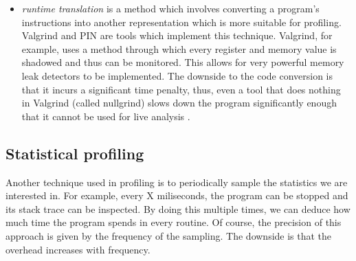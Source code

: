 \begin{itemize}
\begin{itemize}
\item \textit{runtime translation} is a method which involves converting a program's instructions into another representation which is more suitable for profiling. Valgrind\cite{Nethercote07} and PIN\cite{Luk05} are tools which implement this technique. Valgrind, for example, uses a method through which every register and memory value is shadowed and thus can be monitored. This allows for very powerful memory leak detectors to be implemented. The downside to the code conversion is that it incurs a significant time penalty, thus, even a tool that does nothing in Valgrind (called nullgrind) slows down the program significantly enough that it cannot be used for live analysis \cite{Newsome05}.
\end{itemize}
\end{itemize}




\subsection{Statistical profiling}
\label{subsection:statisticalprofiling}

Another technique used in profiling is to periodically sample the statistics we are interested in. For example, every X miliseconds, the program can be stopped and its stack trace can be inspected. By doing this  multiple times, we can deduce how much time the program spends in every routine. Of course, the precision of this approach is given by the frequency of the sampling. The downside is that the overhead increases with frequency.

